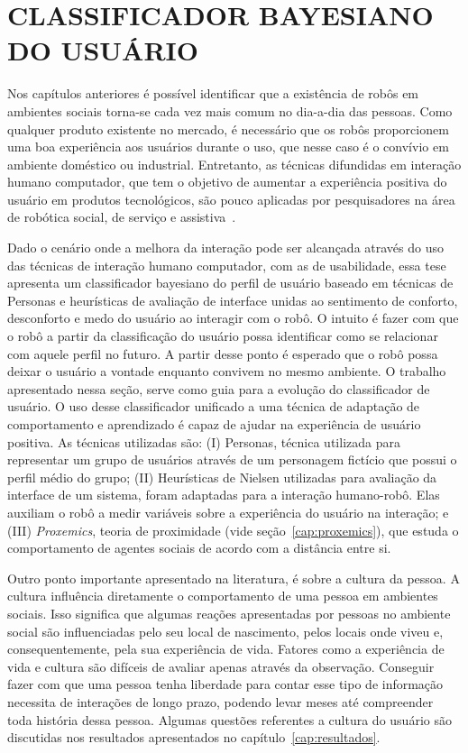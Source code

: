 \chapter{CLASSIFICADOR BAYESIANO DO USUÁRIO}
\label{cap:proposta}

Nos capítulos anteriores é possível identificar que a existência de robôs em ambientes sociais torna-se cada vez mais comum no dia-a-dia das pessoas. Como qualquer produto existente no mercado, é necessário que os robôs proporcionem uma boa experiência aos usuários durante o uso, que nesse caso é o convívio em ambiente doméstico ou industrial. Entretanto, as técnicas difundidas em interação humano computador, que tem o objetivo de aumentar a experiência positiva do usuário em produtos tecnológicos, são pouco aplicadas por pesquisadores na área de robótica social, de serviço e assistiva~\cite{alenljung:2017}.

Dado o cenário onde a melhora da interação pode ser alcançada através do uso das técnicas de interação humano computador, com as de usabilidade, essa tese apresenta um classificador bayesiano do perfil de usuário baseado em técnicas de Personas e heurísticas de avaliação de interface unidas ao sentimento de conforto, desconforto e medo do usuário ao interagir com o robô. O intuito é fazer com que o robô a partir da classificação do usuário possa identificar como se relacionar com aquele perfil no futuro. A partir desse ponto é esperado que o robô possa deixar o usuário a vontade enquanto convivem no mesmo ambiente. O trabalho apresentado nessa seção, serve como guia para a evolução do classificador de usuário. O uso desse classificador unificado a uma técnica de adaptação de comportamento e aprendizado é capaz de ajudar na experiência de usuário positiva. As técnicas utilizadas são: (I) Personas, técnica utilizada para representar um grupo de usuários através de um personagem fictício que possui o perfil médio do grupo; (II) Heurísticas de Nielsen utilizadas para avaliação da interface de um sistema, foram adaptadas para a interação humano-robô. Elas auxiliam o robô a medir variáveis sobre a experiência do usuário na interação; e (III) \emph{Proxemics}, teoria de proximidade (vide seção~\ref{cap:proxemics}), que estuda o comportamento de agentes sociais de acordo com a distância entre si.

Outro ponto importante apresentado na literatura, é sobre a cultura da pessoa. A cultura influência diretamente o comportamento de uma pessoa em ambientes sociais. Isso significa que algumas reações apresentadas por pessoas no ambiente social são influenciadas pelo seu local de nascimento, pelos locais onde viveu e, consequentemente, pela sua experiência de vida. Fatores como a experiência de vida e cultura são difíceis de avaliar apenas através da observação. Conseguir fazer com que uma pessoa tenha liberdade para contar esse tipo de informação necessita de interações de longo prazo, podendo levar meses até compreender toda história dessa pessoa. Algumas questões referentes a cultura do usuário são discutidas nos resultados apresentados no capítulo~\ref{cap:resultados}.

